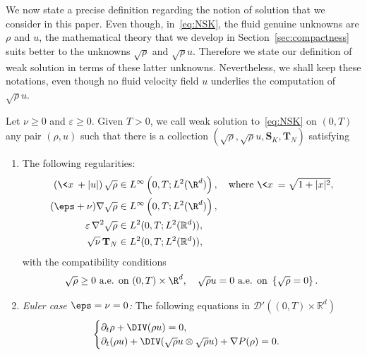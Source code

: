 We now state a precise definition regarding the notion of solution that we consider in this paper. Even though, in~\eqref{eq:NSK}, the fluid genuine unknowns are $\rho$ and $u$, the mathematical theory that we develop in Section~\ref{sec:compactness} suits better to the unknowns $\sqrt{\rho}$ and $\sqrt{\rho}u$. Therefore we state our definition of weak solution in terms of these latter unknowns. Nevertheless, we shall keep these notations, even though no fluid velocity field $u$ underlies the computation of $\sqrt{\rho}u.$

\begin{defi}\label{def:weaksol-minus}
Let $\nu \ge 0$ and $\varepsilon \ge 0.$ Given $T >0$, we call weak solution to~\eqref{eq:NSK} on $(0,T)$ any pair $(\rho,u)$ such that there is a collection $(\sqrt{\rho},\sqrt{\rho}u,\mathbf S_{K},\mathbf T_{N})$ satisfying
\begin{enumerate}
\item \label{2.1.1} The following regularities:
\begin{align*}
\left(\<x\> +|u|\right)\sqrt{\rho} &\in L^{\infty}\left(0,T; L^2 (\R^d)\right),\quad \text{where }\<x\> =\sqrt{1+|x|^2}, \\
(\eps+\nu)\nabla \sqrt \rho &\in L^{\infty}\left(0,T; L^2 (\R^d)\right),\\
\varepsilon \, \nabla^2 \sqrt{\rho} &\in L^2(0,T;L^2(\mathbb R^d)),\\
\sqrt \nu \, \mathbf T_N &\in L^2(0,T; L^2(\mathbb R^d)),
\end{align*}
with the compatibility conditions
\[
\sqrt{\rho} \ge 0 \text{ a.e. on } (0,T)\times \R^d, \quad \sqrt{\rho}u= 0 \text{ a.e. on } \left\{\sqrt{\rho} = 0\right\}.
\]

\item \label{2.1.2} \emph{Euler case $\eps=\nu=0$:} The following equations in $\mathcal D'((0,T)\times \mathbb R^d)$
\begin{equation}\label{eq:NSKminus-bis-euler}
\begin{cases}
\partial_t{\rho}+\DIV ({\rho} u)= 0,\\
\partial_t ({\rho}u) +\DIV (\sqrt{\rho}u \otimes \sqrt{\rho}u) + \nabla P(\rho) =0.
\end{cases}
\end{equation}


\end{enumerate}
\end{defi}
